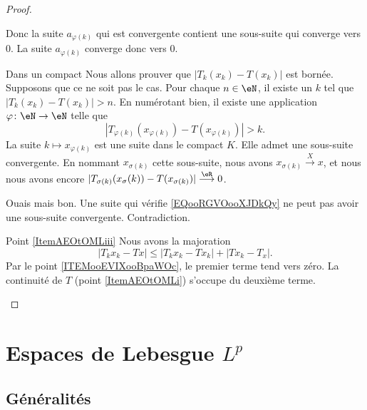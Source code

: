 \begin{proof}
\begin{subproof}
\begin{subproof}
			Donc la suite \( a_{\varphi(k)}\) qui est convergente contient une sous-suite qui converge vers \( 0\). La suite \( a_{\varphi(k)}\) converge donc vers \( 0\).
			\item[Dans un compact]
			Nous allons prouver que \( | T_k(x_k)-T(x_k) |\) est bornée. Supposons que ce ne soit pas le cas. Pour chaque \( n\in \eN\), il existe un \( k\) tel que \( | T_k(x_k)-T(x_k) |>n\). En numérotant bien, il existe une application \( \varphi\colon \eN\to \eN\) telle que
			\begin{equation}        \label{EQooRGVOooXJDkQy}
				| T_{\varphi(k)}(x_{\varphi(k)})-T(x_{\varphi(k)}) |>k.
			\end{equation}
			La suite \( k\mapsto x_{\varphi(k)}\) est une suite dans le compact \( K\). Elle admet une sous-suite convergente. En nommant \( x_{\sigma(k)}\) cette sous-suite, nous avons \( x_{\sigma(k)}\stackrel{X}{\longrightarrow}x\), et nous nous avons encore \( | T_{\sigma(k)}(x_{\sigma}(k))-T(x_{\sigma(k)}) |\stackrel{\eR}{\longrightarrow}0\).

			Ouais mais bon. Une suite qui vérifie \eqref{EQooRGVOooXJDkQy} ne peut pas avoir une sous-suite convergente. Contradiction.
		\end{subproof}
		\item[Point \ref{ItemAEOtOMLiii}]
		Nous avons la majoration
		\begin{equation}
			| T_kx_k-Tx |\leq | T_kx_k-Tx_k |+| Tx_k-T_x |.
		\end{equation}
		Par le point \ref{ITEMooEVIXooBpaWOc}, le premier terme tend vers zéro. La continuité de \( T\) (point \ref{ItemAEOtOMLi}) s'occupe du deuxième terme.
	\end{subproof}
\end{proof}




\section{Espaces de Lebesgue \texorpdfstring{$L^p$}{Lp}}
\label{SecVKiVIQK}

\subsection{Généralités}

